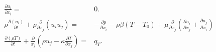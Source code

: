     \begin{align}
      \label{eq:contidiff}
      \frac{\partial u_i}{\partial x_i} =& 0. \\
      \label{eq:momentumdiff}
        \rho \frac{\partial \left( u_i \right)}{\partial t} 
        + \rho \frac{\partial}{\partial x_j} \left( u_i  u_j \right) 
        =& - \frac{\partial p}{\partial x_i} 
        - \rho \beta \left( T - T_0 \right)
        +  \mu \frac{\partial}{\partial x_j} \left( \frac{\partial u_i}{\partial x_j} 
                                             + \frac{\partial u_j}{\partial x_i} \right) \\
    \label{eq:temperaturediff}
    \frac{\partial \left(\rho T \right)}{\partial t} + \frac{\partial}{x_j} \left( \rho u_j - \kappa \frac{\partial T}{\partial x_j} \right) =& q_T.
    \end{align}

